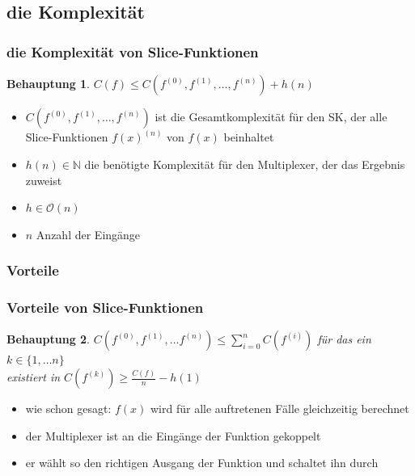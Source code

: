 \documentclass[hyperref={pdfpagelabels=false}]{beamer} %
\newtheorem{beh}{Behauptung}
\begin{document}
  \subsection{die Komplexität}
  \begin{frame}%
    \frametitle{die Komplexität von Slice-Funktionen}
    \begin{beh}
      $C(f) \leq C(f^{(0)}, f^{(1)}, \dots ,f^{(n)})+h(n)$\\
    \end{beh}
    \begin{itemize}
      \item $C(f^{(0)}, f^{(1)}, \dots ,f^{(n)})$ ist die Gesamtkomplexität für den SK, der alle Slice-Funktionen $f(x)^{(n)}$ von $f(x)$ beinhaltet
      \item $h(n) \in \mathbb{N}$ die benötigte Komplexität für den Multiplexer, der das Ergebnis zuweist
      \item $h \in \mathcal{O}(n)$
      \item $n$ Anzahl der Eingänge
    \end{itemize}
%
  \end{frame}

  \subsubsection*{Vorteile}
  \begin{frame}
    \frametitle{Vorteile von Slice-Funktionen}
    \begin{beh}
      $C(f^{(0)}, f^{(1)}, \dots f^{(n)}) \leq \sum_{i=0}^{n}{C(f^{(i)})}$ für das ein $k \in \{1, \dots n\}$\\
      existiert in $C(f^{(k)}) \geq \frac{C(f)}{n} - h(1)$
    \end{beh}
    \begin{itemize}
      \item wie schon gesagt: $f(x)$ wird für alle auftretenen Fälle gleichzeitig berechnet
      \item der Multiplexer ist an die Eingänge der Funktion gekoppelt
      \item er wählt so den richtigen Ausgang der Funktion und schaltet ihn durch
    \end{itemize}
  \end{frame}
\end{document}
